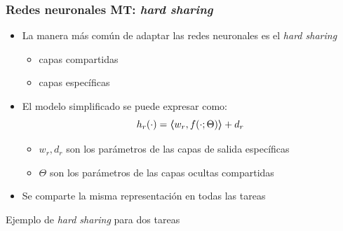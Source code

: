 \documentclass[aspectratio=43,spanish]{beamer}
\newcommand{\dotp}[2]{\bm{\left\langle} #1, #2 \bm{\right\rangle}}
\begin{document}
\begin{frame}
      \frametitle{Redes neuronales MT: \emph{hard sharing}}

      \begin{itemize}
            \item La manera más común de adaptar las redes neuronales es el \emph{hard sharing}~
            \begin{itemize}
                  \item capas compartidas
                  \item capas específicas
            \end{itemize}
            \item El modelo simplificado se puede expresar como:
            \begin{equation}
                  \nonumber
                      h_r(\cdot) =   \dotp{w_r}{f(\cdot; \Theta)}  + d_r
            \end{equation}
            \begin{itemize}
                  \item $w_r, d_r$ son los parámetros de las capas de salida específicas
                  \item $\Theta$ son los parámetros de las capas ocultas compartidas
            \end{itemize}
            \item Se comparte la misma representación en todas las tareas 
      \end{itemize}

\end{frame}


\begin{frame}{Ejemplo de \emph{hard sharing} para dos tareas}

      

\end{frame}
\end{document}
